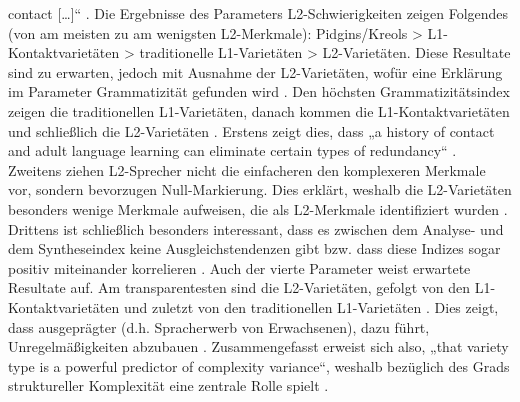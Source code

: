 contact […]“ \citep[69]{SzmrecsanyiKortmann2009}. Die Ergebnisse des Parameters L2-Schwie\-rig\-kei\-ten zeigen Folgendes (von am meisten zu am wenigsten L2-Merk\-ma\-le): Pidgins/Kreols > L1-Kon\-takt\-va\-rie\-tä\-ten > traditionelle L1-Va\-rie\-tä\-ten > L2-Va\-rie\-tä\-ten. Diese Resultate sind zu erwarten, jedoch mit Ausnahme der L2-Va\-rie\-tä\-ten, wofür eine Erklärung im Parameter Grammatizität gefunden wird \citep[71]{SzmrecsanyiKortmann2009}. Den höchsten Grammatizitätsindex zeigen die traditionellen L1-Va\-rie\-tä\-ten, danach kommen die L1-Kon\-takt\-va\-rie\-tä\-ten und schließlich die L2-Va\-rie\-tä\-ten \citep[73]{SzmrecsanyiKortmann2009}. Erstens zeigt dies, dass „a history of contact and adult language learning can eliminate certain types of redundancy“ \citep[73]{SzmrecsanyiKortmann2009}. Zweitens ziehen L2-Spre\-cher nicht die einfacheren den komplexeren Merkmale vor, sondern bevorzugen Null-Markierung. Dies erklärt, weshalb die L2-Va\-rie\-tä\-ten besonders wenige Merkmale aufweisen, die als L2-Merk\-ma\-le identifiziert wurden \citep[73]{SzmrecsanyiKortmann2009}. Drittens ist schließlich besonders interessant, dass es zwischen dem Analyse- und dem Syntheseindex keine Ausgleichstendenzen gibt bzw. dass diese Indizes sogar positiv miteinander korrelieren \citep[74]{SzmrecsanyiKortmann2009}. Auch der vierte Parameter weist erwartete Resultate auf. Am transparentesten sind die L2-Va\-rie\-tä\-ten, gefolgt von den L1-Kon\-takt\-va\-rie\-tä\-ten und zuletzt von den traditionellen L1-Va\-rie\-tä\-ten \citep[75]{SzmrecsanyiKortmann2009}. Dies zeigt, dass ausgeprägter  (d.h. Spracherwerb von Erwachsenen), dazu führt, Unregelmäßigkeiten abzubauen \citep[75]{SzmrecsanyiKortmann2009}. Zusammengefasst erweist sich also, „that variety type is a powerful predictor of complexity variance“, weshalb  bezüglich des Grads struktureller Komplexität eine zentrale Rolle spielt \citep[76]{SzmrecsanyiKortmann2009}.

